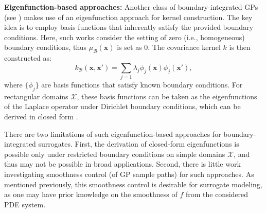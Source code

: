 \documentclass[aos,preprint]{imsart}
\theoremstyle{plain}
\newcommand{\BFx}{\bold x}
\theoremstyle{remark}
\begin{document}

\textbf{Eigenfunction-based approaches:} Another class of boundary-integrated GPs (see \cite{solin2019know,solin2020hilbert,gulian2022gaussian}) makes use of an eigenfunction approach for kernel construction. The key idea is to employ basis functions that inherently satisfy the provided boundary conditions. Here, such works consider the setting of zero (i.e., homogeneous) boundary conditions, thus $\mu_{\mathcal{B}}(\mathbf{x})$ is set as 0. The covariance kernel $k$ is then constructed as:
\[
k_{\mathcal{B}}(\mathbf{x},\mathbf{x}') = \sum_{j=1} \lambda_j \phi_j(\mathbf{x}) \phi_j(\mathbf{x}'),
\]
where \(\{\phi_j\}\) are basis functions that satisfy known boundary conditions. For rectangular domains $\mathcal{X}$, these basis functions can be taken as the eigenfunctions of the Laplace operator under Dirichlet boundary conditions, which can be derived in closed form \citep{dalton2024boundary}. 

There are two limitations of such eigenfunction-based approaches for boundary-integrated surrogates. First, the derivation of closed-form eigenfunctions is possible only under restricted boundary conditions on simple domains $\mathcal{X}$, and thus may not be possible in broad applications. Second, there is little work investigating smoothness control (of GP sample paths) for such approaches. As mentioned previously, this smoothness control is desirable for surrogate modeling, as one may have prior knowledge on the smoothness of $f$ from the considered PDE system.
\end{document}
